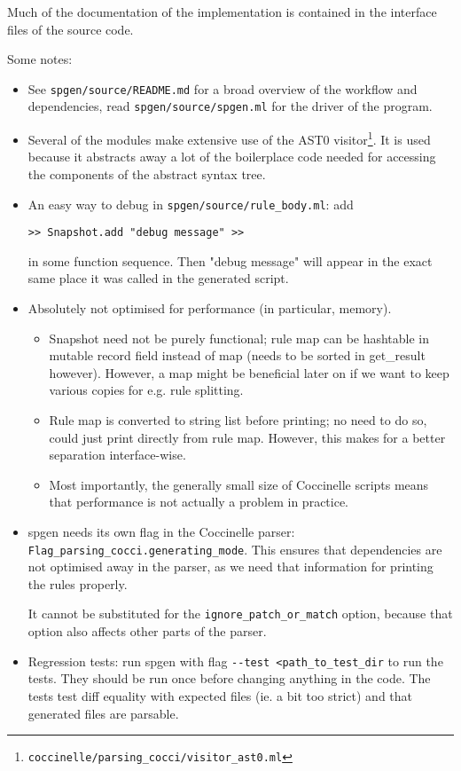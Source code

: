 Much of the documentation of the implementation is contained in the interface files of the source code.

Some notes:
\begin{itemize}
\item See \texttt{spgen/source/README.md} for a broad overview of the workflow and dependencies, read \texttt{spgen/source/spgen.ml} for the driver of the program.
\item Several of the modules make extensive use of the AST0 visitor\footnote{\texttt{coccinelle/parsing\_cocci/visitor\_ast0.ml}}. It is used because it abstracts away a lot of the boilerplace code needed for accessing the components of the abstract syntax tree.
\item An easy way to debug in \texttt{spgen/source/rule\_body.ml}: add
\begin{verbatim}
>> Snapshot.add "debug message" >>
\end{verbatim}
in some function sequence. Then "debug message" will appear in the exact same place it was called in the generated script.
\item Absolutely not optimised for performance (in particular, memory).

  \begin{itemize}
  \item Snapshot need not be purely functional; rule map can be hashtable in mutable record field instead of map (needs to be sorted in get\_result however). However, a map might be beneficial later on if we want to keep various copies for e.g. rule splitting.
  \item Rule map is converted to string list before printing; no need to do so, could just print directly from rule map. However, this makes for a better separation interface-wise.
  \item Most importantly, the generally small size of Coccinelle scripts means that performance is not actually a problem in practice.
  \end{itemize}

\item spgen needs its own flag in the Coccinelle parser: \texttt{Flag\_parsing\_cocci.generating\_mode}. This ensures that dependencies are not optimised away in the parser, as we need that information for printing the rules properly.

It cannot be substituted for the \texttt{ignore\_patch\_or\_match} option, because that option also affects other parts of the parser.
\item Regression tests: run spgen with flag \texttt{-{}-test <path\_to\_test\_dir} to run the tests. They should be run once before changing anything in the code. The tests test diff equality with expected files (ie. a bit too strict) and that generated files are parsable.
\end{itemize}